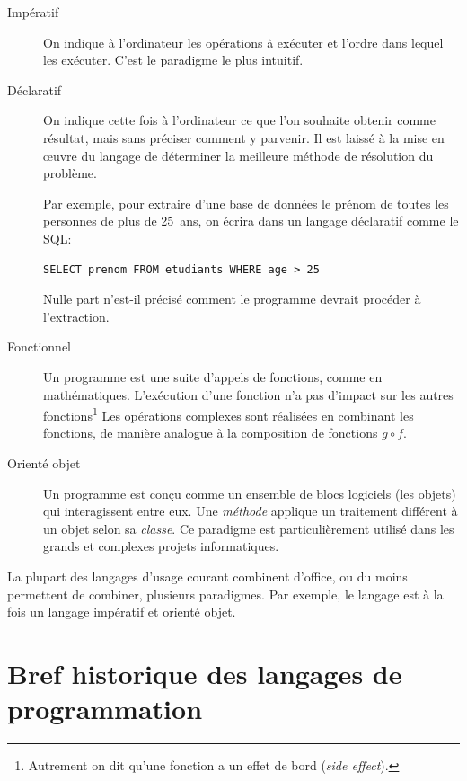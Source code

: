\begin{description}
\item[Impératif]  On indique à l'ordinateur
  les opérations à exécuter et l'ordre dans lequel les exécuter. C'est
  le paradigme le plus intuitif.
\item[Déclaratif]  On indique cette fois à
  l'ordinateur ce que l'on souhaite obtenir comme résultat, mais sans
  préciser comment y parvenir. Il est laissé à la mise en œuvre du
  langage de déterminer la meilleure méthode de résolution du
  problème.

  Par exemple, pour extraire d'une base de données  le
  prénom de toutes les personnes de plus de 25~ans, on écrira dans un
  langage déclaratif comme le SQL:
\begin{Schunk}
\begin{Verbatim}
SELECT prenom FROM etudiants WHERE age > 25
\end{Verbatim}
\end{Schunk}
  Nulle part n'est-il précisé comment le programme devrait procéder à
  l'extraction.
\item[Fonctionnel]  Un programme est une
  suite d'appels de fonctions, comme en mathématiques. L'exécution
  d'une fonction n'a pas d'impact sur les autres fonctions\footnote{%
    Autrement on dit qu'une fonction a un effet de bord (\emph{side
      effect}).} %
  Les opérations complexes sont réalisées en combinant les fonctions,
  de manière analogue à la composition de fonctions $g \circ f$.
\item[Orienté objet]  Un programme est
  conçu comme un ensemble de blocs logiciels (les objets) qui
  interagissent entre eux. Une \emph{méthode} applique un traitement
  différent à un objet selon sa \emph{classe}. Ce paradigme est
  particulièrement utilisé dans les grands et complexes projets
  informatiques.
\end{description}

La plupart des langages d'usage courant combinent d'office, ou du
moins permettent de combiner, plusieurs paradigmes. Par exemple, le
langage {\Cpp} est à la fois un langage impératif et orienté objet.


\section{Bref historique des langages de programmation}
\label{sec:informatique:historique}

